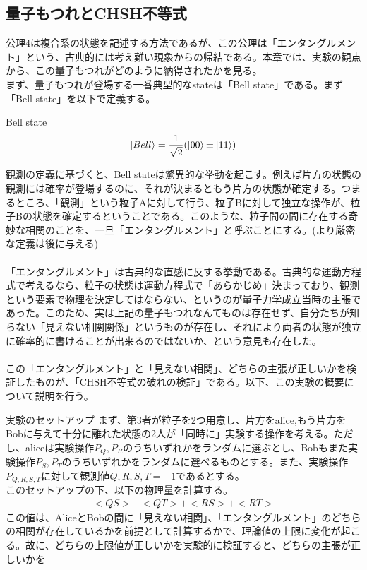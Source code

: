 \documentclass[a4paper,10.5pt]{article}
\numberwithin{equation}{section}
\begin{document}
 \subsection{量子もつれとCHSH不等式}
公理4は複合系の状態を記述する方法であるが、この公理は「エンタングルメント」という、古典的には考え難い現象からの帰結である。本章では、実験の観点から、この量子もつれがどのように納得されたかを見る。\\
まず、量子もつれが登場する一番典型的なstateは「Bell state」である。まず「Bell state」を以下で定義する。
\begin{defbox}{Bell state}
  \begin{equation}\begin{split}
      \ket{Bell}=\frac{1}{\sqrt{2}}(\ket{00}\pm\ket{11})
  \end{split} \end{equation}
\end{defbox}
観測の定義に基づくと、Bell stateは驚異的な挙動を起こす。例えば片方の状態の観測には確率が登場するのに、それが決まるともう片方の状態が確定する。つまるところ、「観測」という粒子Aに対して行う、粒子Bに対して独立な操作が、粒子Bの状態を確定するということである。このような、粒子間の間に存在する奇妙な相関のことを、一旦「エンタングルメント」と呼ぶことにする。(より厳密な定義は後に与える)\\
\\
「エンタングルメント」は古典的な直感に反する挙動である。古典的な運動方程式で考えるなら、粒子の状態は運動方程式で「あらかじめ」決まっており、観測という要素で物理を決定してはならない、というのが量子力学成立当時の主張であった。このため、実は上記の量子もつれなんてものは存在せず、自分たちが知らない「見えない相関関係」というものが存在し、それにより両者の状態が独立に確率的に書けることが出来るのではないか、という意見も存在した。\\
\\
この「エンタングルメント」と「見えない相関」、どちらの主張が正しいかを検証したものが、「CHSH不等式の破れの検証」である。以下、この実験の概要について説明を行う。

\begin{setupbox}{実験のセットアップ}
まず、第3者が粒子を2つ用意し、片方をalice,もう片方をBobに与えて十分に離れた状態の2人が「同時に」実験する操作を考える。ただし、aliceは実験操作$P_{Q},P_{R}$のうちいずれかをランダムに選ぶとし、Bobもまた実験操作$P_{S},P_{T}$のうちいずれかをランダムに選べるものとする。また、実験操作$P_{Q,R,S,T}$に対して観測値$Q,R,S,T=\pm 1$であるとする。\\
このセットアップの下、以下の物理量を計算する。
\begin{align}
<QS>-<QT>+<RS>+<RT>
\end{align}
この値は、AliceとBobの間に「見えない相関」、「エンタングルメント」のどちらの相関が存在しているかを前提として計算するかで、理論値の上限に変化が起こる。故に、どちらの上限値が正しいかを実験的に検証すると、どちらの主張が正しいかを
\end{setupbox}
\end{document}
